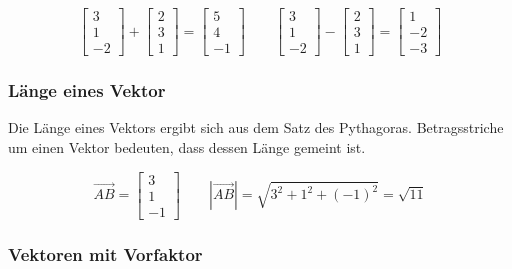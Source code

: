 \begin{equation*}
    \begin{bmatrix}
        3 \\
        1 \\
        -2
    \end{bmatrix}
    +
    \begin{bmatrix}
        2 \\
        3 \\
        1
    \end{bmatrix}
    =
    \begin{bmatrix}
        5 \\
        4 \\
        -1
    \end{bmatrix}
    \qquad
    \begin{bmatrix}
        3 \\
        1 \\
        -2
    \end{bmatrix}
    -
    \begin{bmatrix}
        2 \\
        3 \\
        1
    \end{bmatrix}
    =
    \begin{bmatrix}
        1 \\
        -2 \\
        -3
    \end{bmatrix}
\end{equation*}

\subsubsection{Länge eines Vektor}

Die Länge eines Vektors ergibt sich aus dem Satz des Pythagoras.
Betragsstriche um einen Vektor bedeuten, dass dessen Länge gemeint ist.

\begin{equation*}
    \overrightarrow{AB} = \begin{bmatrix}
        3 \\
        1 \\
        -1
    \end{bmatrix}
    \qquad | \overrightarrow{AB} | = \sqrt{3^2 + 1^2 + (-1)^2} = \sqrt{11}
\end{equation*}

\subsubsection{Vektoren mit Vorfaktor}

